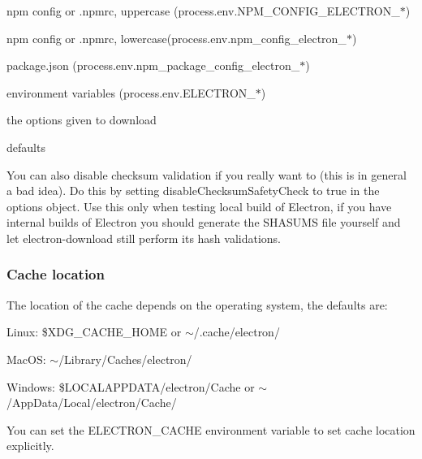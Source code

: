 \begin{DoxyEnumerate}
\item npm config or .npmrc, uppercase ({\ttfamily process.\+env.\+N\+P\+M\+\_\+\+C\+O\+N\+F\+I\+G\+\_\+\+E\+L\+E\+C\+T\+R\+O\+N\+\_\+$\ast$})
\end{DoxyEnumerate}
\begin{DoxyEnumerate}
\item npm config or .npmrc, lowercase({\ttfamily process.\+env.\+npm\+\_\+config\+\_\+electron\+\_\+$\ast$})
\end{DoxyEnumerate}
\begin{DoxyEnumerate}
\item package.\+json ({\ttfamily process.\+env.\+npm\+\_\+package\+\_\+config\+\_\+electron\+\_\+$\ast$})
\end{DoxyEnumerate}
\begin{DoxyEnumerate}
\item environment variables ({\ttfamily process.\+env.\+E\+L\+E\+C\+T\+R\+O\+N\+\_\+$\ast$})
\end{DoxyEnumerate}
\begin{DoxyEnumerate}
\item the options given to {\ttfamily download}
\end{DoxyEnumerate}
\begin{DoxyEnumerate}
\item defaults
\end{DoxyEnumerate}

You can also disable checksum validation if you really want to (this is in general a bad idea). Do this by setting {\ttfamily disable\+Checksum\+Safety\+Check} to {\ttfamily true} in the options object. Use this only when testing local build of Electron, if you have internal builds of Electron you should generate the S\+H\+A\+S\+U\+MS file yourself and let {\ttfamily electron-\/download} still perform its hash validations.

\subsubsection*{Cache location}

The location of the cache depends on the operating system, the defaults are\+:
\begin{DoxyItemize}
\item Linux\+: {\ttfamily \$\+X\+D\+G\+\_\+\+C\+A\+C\+H\+E\+\_\+\+H\+O\+ME} or {\ttfamily $\sim$/.cache/electron/}
\item Mac\+OS\+: {\ttfamily $\sim$/\+Library/\+Caches/electron/}
\item Windows\+: {\ttfamily \$\+L\+O\+C\+A\+L\+A\+P\+P\+D\+A\+TA/electron/\+Cache} or {\ttfamily $\sim$/\+App\+Data/\+Local/electron/\+Cache/}
\end{DoxyItemize}

You can set the {\ttfamily E\+L\+E\+C\+T\+R\+O\+N\+\_\+\+C\+A\+C\+HE} environment variable to set cache location explicitly. 